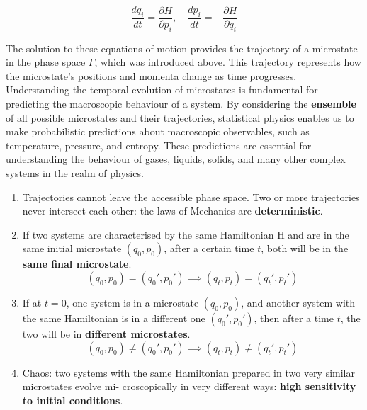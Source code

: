\documentclass[12pt,a4paper]{report}
\newcommand{\esp}{\vspace{0.5cm}}
\begin{document}
	\esp
	
	\begin{equation}
		\frac{dq_i}{dt} =\frac{\partial H}{\partial p_i}, \quad \frac{dp_i}{dt} =-\frac{\partial H}{\partial q_i}
	\end{equation}

	\esp

	The solution to these equations of motion provides the trajectory of a microstate in the phase space $\Gamma$,
	which was introduced above. This trajectory represents how the microstate’s positions and momenta change
	as time progresses. Understanding the temporal evolution of microstates is fundamental for predicting
	the macroscopic behaviour of a system. By considering the \textbf{ensemble} of all possible microstates and their
	trajectories, statistical physics enables us to make probabilistic predictions about macroscopic observables,
	such as temperature, pressure, and entropy. These predictions are essential for understanding the behaviour
	of gases, liquids, solids, and many other complex systems in the realm of physics.
	
	\esp
	
	\begin{enumerate}
		\item Trajectories cannot leave the accessible phase space. Two or more trajectories never intersect each
		other: the laws of Mechanics are \textbf{deterministic}.
		\item If two systems are characterised by the same Hamiltonian H and are in the same initial microstate
		$(q_0, p_0)$, after a certain time $t$, both will be in the \textbf{same final microstate}.
		\begin{equation*}
			(q_0, p_0) = (q_0', p_0') \implies (q_t, p_t) = (q_t', p_t')
		\end{equation*}
		\item If at $t = 0$, one system is in a microstate $(q_0, p_0)$, and another system with the same Hamiltonian is in a different one $(q_0', p_0')$, then after a time $t$, the two will be in \textbf{different microstates}.
		\begin{equation*}
			(q_0, p_0) \neq (q_0', p_0') \implies (q_t, p_t) \neq (q_t', p_t')
		\end{equation*}
		\item Chaos: two systems with the same Hamiltonian prepared in two very similar microstates evolve mi-
		croscopically in very different ways: \textbf{high sensitivity to initial conditions}.
	\end{enumerate}
\end{document}
